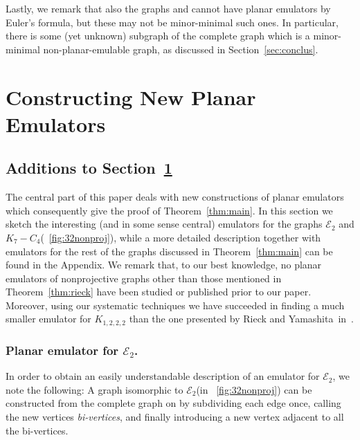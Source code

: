 \documentclass[envcountsect,envcountsame]{llncs}
\newenvironment{onlynoaccum}{}{}
\newcommand{\KK}{\ensuremath{{K}_7 - C_4}\xspace}
\newcommand{\KKK}{\ensuremath{K_{1,2,2,2}}\xspace}
\newcommand{\EE}{\ensuremath{\mathcal{E}_2}\xspace}
\begin{document}
Lastly, we remark that also the graphs  and  cannot have
planar emulators by Euler's formula, but these may not be minor-minimal such ones.
In particular, there is some (yet unknown) subgraph of the complete graph  which is
a minor-minimal non-planar-emulable graph, as discussed in
Section~\ref{sec:conclus}.









\section{Constructing New Planar Emulators}
\label{sec:construct}
\begin{onlyaccum}
\subsection{Additions to Section~\ref{sec:construct}}
\end{onlyaccum}

The central part of this paper deals with new constructions of planar
emulators which consequently give the proof of Theorem~\ref{thm:main}.
\begin{onlynoaccum}
In this section we sketch the interesting
(and in some sense central) emulators for
the graphs \EE and \KK (\figurename~\ref{fig:32nonproj}),
while a more detailed description together with emulators for the rest
of the graphs discussed in Theorem~\ref{thm:main} can be found in the Appendix. 
\end{onlynoaccum}
We remark that, to our best knowledge, no planar emulators of nonprojective 
graphs other than those mentioned in Theorem~\ref{thm:rieck} have been 
studied or published prior to our paper.
Moreover, using our systematic techniques we have succeeded in
finding a much smaller emulator for \KKK than the one presented by Rieck and
Yamashita~in~\cite{cit:rieck}.



\subsubsection*{Planar emulator for \EE.}
In order to obtain an easily understandable description of an emulator for \EE,
we note the following:
A graph isomorphic to \EE (in \figurename~\ref{fig:32nonproj}) can be constructed
from the complete graph  on 
by subdividing each edge once, calling the new vertices \emph{bi-vertices},
and finally introducing a new vertex  adjacent to all the bi-vertices.
\end{document}
